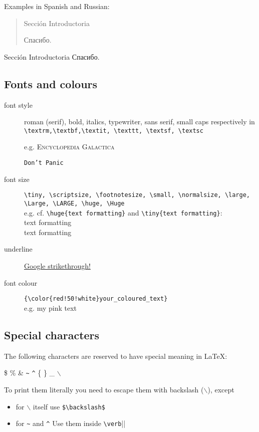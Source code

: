 \documentclass[a4paper,11pt]{article}
\begin{document}
Examples in Spanish and Russian:

\begin{center}
	\begin{quote}
		\foreignlanguage{spanish}{Sección Introductoria} 
		
		\foreignlanguage{russian}{Спасибо.}
	\end{quote}
	
	Sección Introductoria
	Спасибо.
\end{center}

\subsection{Fonts and colours}

\begin{description}
	\item[font style] roman (serif), bold, italics, typewriter, sans serif, small caps respectively in \\
	\verb|\textrm,\textbf,\textit, \texttt, \textsf, \textsc|
	
	e.g. \textsc{Encyclopedia Galactica} 
	
	\texttt{Don't Panic}
	
	\item[font size] \verb|\tiny, \scriptsize, \footnotesize, \small, \normalsize, \large, \Large, \LARGE, \huge, \Huge| \\
	e.g. cf. \verb|\huge{text formatting}| and \verb|\tiny{text formatting}|: \\
	\huge{text formatting} \\
	\tiny{text formatting}
	\normalsize
	
	\item[underline] \underline{Google strikethrough!}
	
	\item[font colour] \verb|{\color{red!50!white}your_coloured_text}| \\
	 e.g. {\color{red!50!white}my pink text}
 
\end{description}


\subsection{Special characters}
The following characters are reserved to have special meaning in \LaTeX:

\$ \% \& \verb|~| \verb|^| \{ \} \_ $\backslash$ 

To print them literally you need to escape them with backslash ($\backslash$), except
\begin{itemize}
	\item for $\backslash$ itself use \verb|$\backslash$|
	\item for \verb|~| and \verb|^| Use them inside \verb|\verb||| 
\end{itemize}
\end{document}
